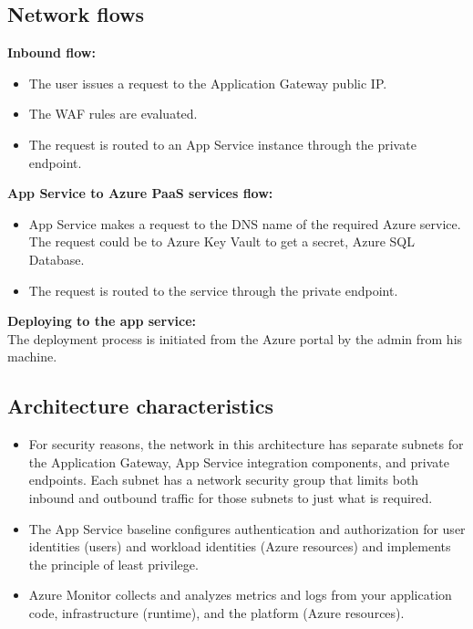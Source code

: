 \subsection*{Network flows}
\textbf{Inbound flow:}
\begin{itemize}
    \item The user issues a request to the Application Gateway public IP.
    \item The WAF rules are evaluated.
    \item The request is routed to an App Service instance through the private endpoint.
\end{itemize}
\textbf{App Service to Azure PaaS services flow:}
\begin{itemize}
    \item App Service makes a request to the DNS name of the required Azure service. The request could be to Azure Key Vault to get a secret, Azure SQL Database.
    \item The request is routed to the service through the private endpoint.
\end{itemize}

\textbf{Deploying to the app service:} \\
The deployment process is initiated from the Azure portal by the admin from his machine.

\subsection*{Architecture characteristics}
\begin{itemize}
    \item For security reasons, the network in this architecture has separate subnets for the Application Gateway, App Service integration components, and private endpoints. Each subnet has a network security group that limits both inbound and outbound traffic for those subnets to just what is required.
    \item The App Service baseline configures authentication and authorization for user identities (users) and workload identities (Azure resources) and implements the principle of least privilege.
    \item Azure Monitor collects and analyzes metrics and logs from your application code, infrastructure (runtime), and the platform (Azure resources).
\end{itemize}
